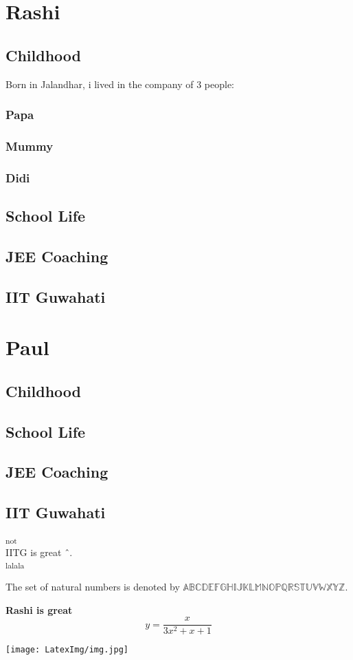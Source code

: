 \documentclass[12pt]{article}
\begin{document}
	\section{Rashi}
		\subsection{Childhood}
		Born in Jalandhar, i lived in the company of 3 people:
			\subsubsection{Papa}
			\subsubsection{Mummy}
			\subsubsection{Didi}
		\subsection{School Life}
		\subsection{JEE Coaching}
		\subsection{IIT Guwahati}
	\section{Paul}	
		\subsection{Childhood}
		\subsection{School Life}
		\subsection{JEE Coaching}
		\subsection{IIT Guwahati}
		\begin{flushright}
				\textsubscript{not}\\
				IITG is great \^ \ .\\
				\textsuperscript{lalala}
		\end{flushright}
	
	The set of natural numbers is denoted by $\mathbb{ABCDEFGHIJKLMNOPQRSTUVWXYZ}$.
	
	\def\myLabel{Rashi is great}
	\textbf{\myLabel}
	\vspace{1in}
	\def\myeq{y=\frac{x}{3x^2+x+1}}
	$$\displaystyle \myeq$$
	\begin{center}
		\texttt{[image: LatexImg/img.jpg]}	
	\end{center}
	
\end{document}
